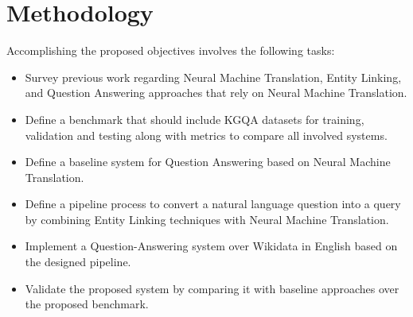 \section{Methodology}
Accomplishing the proposed objectives involves the following tasks:
\begin{itemize}
    \item Survey previous work regarding Neural Machine Translation, Entity Linking, and 
    Question Answering approaches that rely on Neural Machine Translation.
    \item Define a benchmark that should include KGQA datasets for training, validation and 
    testing along with metrics to compare all involved systems.
    \item Define a baseline system for Question Answering based on Neural Machine Translation.
    \item Define a pipeline process to convert a natural language question into a \SPARQL{} query 
    by combining Entity Linking techniques with Neural Machine Translation.
    \item Implement a Question-Answering system over Wikidata in English based on the designed pipeline.
    \item Validate the proposed system by comparing it with baseline approaches over the 
    proposed benchmark.
\end{itemize}
